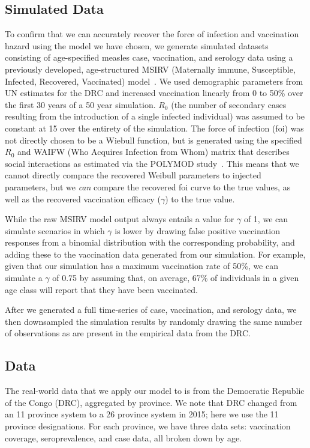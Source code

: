 \documentclass[nofootinbib,aps,pre,twocolumn,superscriptaddress,showkeys,showpacs]{revtex4-1}
\begin{document}
\subsection{Simulated Data\label{subsec:SimData}}
To confirm that we can accurately recover the force of infection and vaccination hazard using the model we have chosen, we generate simulated datasets consisting of age-specified measles case, vaccination, and serology data using a previously developed, age-structured MSIRV (Maternally immune, Susceptible, Infected, Recovered, Vaccinated) model~\cite{Metcalf2012}. We used demographic parameters from UN estimates for the DRC and increased vaccination linearly from 0 to 50\% over the first 30 years of a 50 year simulation. $R_{0}$ (the number of secondary cases resulting from the introduction of a single infected individual) was assumed to be constant at 15 over the entirety of the simulation. The force of infection (foi) was not directly chosen to be a Wiebull function, but is generated using the specified $R_0$ and WAIFW (Who Acquires Infection from Whom) matrix that describes social interactions as estimated via the POLYMOD study~\cite{Mossong2008}. This means that we cannot directly compare the recovered Weibull parameters to injected parameters, but we \emph{can} compare the recovered foi curve to the true values, as well as the recovered vaccination efficacy ($\gamma$) to the true value. 

While the raw MSIRV model output always entails a value for $\gamma$ of 1, we can simulate scenarios in which $\gamma$ is lower by drawing false positive vaccination responses from a binomial distribution with the corresponding probability, and adding these to the vaccination data generated from our simulation. For example, given that our simulation has a maximum vaccination rate of 50\%, we can simulate a $\gamma$ of 0.75 by assuming that, on average, 67\% of individuals in a given age class will report that they have been vaccinated.

After we generated a full time-series of case, vaccination, and serology data, we then downsampled the simulation results by randomly drawing the same number of observations as are present in the empirical data from the DRC.

\subsection{Data \label{subsec:Data}}
The real-world data that we apply our model to is from the Democratic Republic of the Congo (DRC), aggregated by province. We note that DRC changed from an 11 province system to a 26 province system in 2015; here we use the 11 province designations. For each province, we have three data sets: vaccination coverage, seroprevalence, and case data, all broken down by age. 
\end{document}
